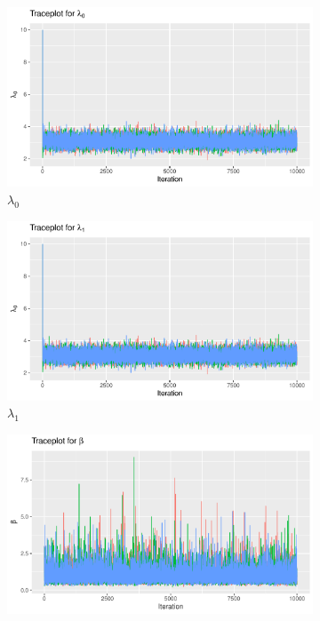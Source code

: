 \begin{figure}[h]
    \centering
    \begin{subfigure}[b]{0.49\textwidth}
        \centering
        \includegraphics[width = \textwidth]{Images/mixing_lambda_0.pdf}
        \caption{$\lambda_0$}
        \label{fig:}
    \end{subfigure}
    \begin{subfigure}[b]{0.49\textwidth}
        \centering
        \includegraphics[width = \textwidth]{Images/mixing_lambda_1.pdf}
        \caption{$\lambda_1$}
        \label{fig:}
    \end{subfigure}
    \begin{subfigure}[b]{0.49\textwidth}
        \centering
        \includegraphics[width = \textwidth]{Images/mixing_beta.pdf}

\end{subfigure}
\end{figure}
